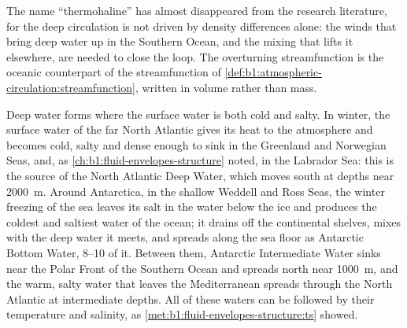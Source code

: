 The name ``thermohaline'' has almost disappeared from the research literature, for
the deep circulation is not driven by density differences alone: the winds that
bring deep water up in the Southern Ocean, and the mixing that lifts it elsewhere,
are needed to close the loop. The overturning streamfunction is the oceanic
counterpart of the streamfunction of \cref{def:b1:atmospheric-circulation:streamfunction},
written in volume rather than mass.

Deep water forms where the surface water is both cold and salty. In winter, the
surface water of the far North Atlantic gives its heat to the atmosphere and becomes
cold, salty and dense enough to sink in the Greenland and Norwegian Seas, and, as
\cref{ch:b1:fluid-envelopes-structure} noted, in the Labrador Sea: this is the
source of the North Atlantic Deep Water, which moves south at depths near
\qty{2000}{m}. Around Antarctica, in the shallow
Weddell and Ross Seas, the winter freezing of the sea leaves its salt in the water
below the ice and produces the coldest and saltiest water of the ocean; it drains
off the continental shelves, mixes with the deep water it meets, and spreads along
the sea floor as Antarctic Bottom Water, \qtyrange{8}{10}{\sverdrup} of it. Between
them, Antarctic Intermediate Water sinks near the Polar Front of the Southern Ocean
and spreads north near \qty{1000}{m}, and the warm, salty water that leaves the
Mediterranean spreads through the North Atlantic at intermediate depths. All of
these waters can be followed by their temperature and salinity, as
\cref{met:b1:fluid-envelopes-structure:ts} showed.

